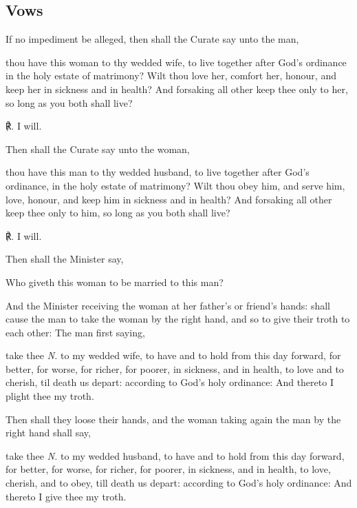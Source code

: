 \subsection{Vows}
\begin{rubric}
    If no impediment be alleged, then shall the Curate say unto the man,
\end{rubric}
 thou have this woman to thy wedded wife, to live together after God's ordinance in the holy estate of matrimony? Wilt thou love her, comfort her, honour, and keep her in sickness and in health? And forsaking all other keep thee only to her, so long as you both shall live?\par
℟. I will.\par
\begin{rubric}
	Then shall the Curate say unto the woman,
\end{rubric}
 thou have this man to thy wedded husband, to live together after God's ordinance, in the holy estate of matrimony? Wilt thou obey him, and serve him, love, honour, and keep him in sickness and in health? And forsaking all other keep thee only to him, so long as you both shall live?\par
℟. I will.\par
\begin{rubric}
	Then shall the Minister say,
\end{rubric}\noindent
Who giveth this woman to be married to this man?
\begin{rubric}
	And the Minister receiving the woman at her father's or friend's hands: shall cause the man to take the woman by the right hand, and so to give their troth to each other: The man first saying,
\end{rubric}
 take thee \textit{N.} to my wedded wife, to have and to hold from this day forward, for better, for worse, for richer, for poorer, in sickness, and in health, to love and to cherish, 
til death us depart: according to God's holy ordinance: And thereto I plight thee my troth.
\begin{rubric}
	Then shall they loose their hands, and the woman taking again the man by the right hand shall say,
\end{rubric}
 take thee \textit{N.} to my wedded husband, to have and to hold from this day forward, for better, for worse, for richer, for poorer, in sickness, and in health, to love, cherish, and to obey, till death us depart: according to God's holy ordinance: And thereto I give thee my troth.

